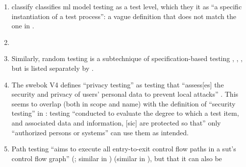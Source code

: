 \begin{enumerate}
    \item %
           \citetISTQB{} \ifnotpaper classify \else classifies \fi
          \acs{ml} model testing as a test level, which \ifnotpaper they \else
              it \fi {} as ``a specific instantiation of a
          test process'': a vague definition that does not match the one in
          .
    \item %
          \perfSecParFlaw{}
    \item %
          Similarly, random testing is a subtechnique of specification-based
          testing \ifnotpaper
              \citetext{\citealp[pp.~7, 22]{IEEE2022};
                  \citeyear[pp.~5, 20, Fig.~2]{IEEE2021};
                  \citealp[p.~5\=/12]{SWEBOK2024}; \citealpISTQB{}} \else
              \cite[pp.~7, 22]{IEEE2022}, \cite{ISTQB},
              \cite[p.~5\=/12]{SWEBOK2024}, \cite[pp.~5, 20, Fig.~2]{IEEE2021}
          \fi but is listed
          separately by \citet[p.~46]{Firesmith2015}.
    \item %
          The \acs{swebok} V4 defines ``privacy testing'' as testing that
          ``assess[es] the security and privacy of users' personal data to
          prevent local attacks'' \citep[p.~5\=/10]{SWEBOK2024}. This seems to
          overlap (both in scope and name) with the definition of ``security
          testing'' in \citep[p.~7]{IEEE2022}: testing
          ``conducted to evaluate the degree to which a test item, and
          associated data and information, [sic] are protected so that'' only
          ``authorized persons or systems'' can use them as intended.
    \item %
          Path testing ``aims to execute all entry-to-exit control flow paths
          in a \acs{sut}'s control flow graph'' \ifnotpaper
              (\citealp[p.~5-13]{SWEBOK2024}; similar in
              \citealp[p.~119]{Patton2006})\else \cite[p.~5-13]{SWEBOK2024}
              (similar in \cite[p.~119]{Patton2006})\fi, but
          \citet[p.~316]{IEEE2017}  that it can also be

\end{enumerate}

